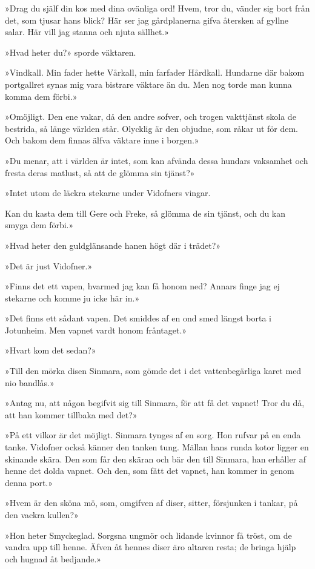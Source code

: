 »Drag du själf din kos med dina ovänliga ord! Hvem, tror du, vänder sig
bort från det, som tjusar hans blick? Här ser jag gårdplanerna gifva
återsken af gyllne salar. Här vill jag stanna och njuta sällhet.»

»Hvad heter du?» sporde väktaren.

»Vindkall. Min fader hette Vårkall, min farfader Hårdkall. Hundarne där
bakom portgallret synas mig vara bistrare väktare än du. Men nog torde
man kunna komma dem förbi.»

»Omöjligt. Den ene vakar, då den andre sofver, och trogen vakttjänst
skola de bestrida, så länge världen står. Olycklig är den objudne, som
råkar ut för dem. Och bakom dem finnas älfva väktare inne i borgen.»

»Du menar, att i världen är intet, som kan afvända dessa hundars
vaksamhet och fresta deras matlust, så att de glömma sin tjänst?»

»Intet utom de läckra stekarne under Vidofners vingar.

Kan du kasta dem till Gere och Freke, så glömma de sin tjänst, och du
kan smyga dem förbi.»

»Hvad heter den guldglänsande hanen högt där i trädet?»

»Det är just Vidofner.»

»Finns det ett vapen, hvarmed jag kan få honom ned? Annars finge jag ej
stekarne och komme ju icke här in.»

»Det finns ett sådant vapen. Det smiddes af en ond smed längst borta i
Jotunheim. Men vapnet vardt honom fråntaget.»

»Hvart kom det sedan?»

»Till den mörka disen Sinmara, som gömde det i det vattenbegärliga karet
med nio bandlås.»

»Antag nu, att någon begifvit sig till Sinmara, för att få det vapnet!
Tror du då, att han kommer tillbaka med det?»

»På ett vilkor är det möjligt. Sinmara tynges af en sorg. Hon rufvar på
en enda tanke. Vidofner också känner den tanken tung. Mällan hans runda
kotor ligger en skinande skära. Den som får den skäran och bär den till
Sinmara, han erhåller af henne det dolda vapnet. Och den, som fått det
vapnet, han kommer in genom denna port.»

»Hvem är den sköna mö, som, omgifven af diser, sitter, försjunken i
tankar, på den vackra kullen?»

»Hon heter Smyckeglad. Sorgsna ungmör och lidande kvinnor få tröst, om
de vandra upp till henne. Äfven åt hennes diser äro altaren resta; de
bringa hjälp och hugnad åt bedjande.»

